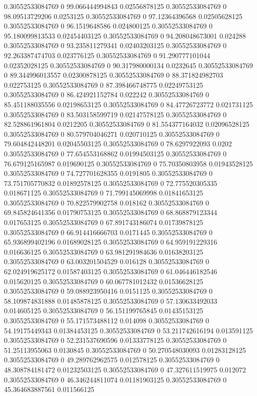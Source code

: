 0.30552533084769 0 99.066444994843 0.02556878125
0.30552533084769 0 98.09513729206 0.0253125
0.30552533084769 0 97.12364396568 0.02505628125
0.30552533084769 0 96.1519648586 0.024800125
0.30552533084769 0 95.180099813533 0.02454403125
0.30552533084769 0 94.208048673001 0.024288
0.30552533084769 0 93.235811279341 0.02403203125
0.30552533084769 0 92.263387474703 0.023776125
0.30552533084769 0 91.290777101044 0.02352028125
0.30552533084769 0 90.317980000134 0.0232645
0.30552533084769 0 89.344996013557 0.02300878125
0.30552533084769 0 88.371824982703 0.022753125
0.30552533084769 0 87.398466748775 0.02249753125
0.30552533084769 0 86.424921152784 0.022242
0.30552533084769 0 85.451188035556 0.02198653125
0.30552533084769 0 84.47726723772 0.021731125
0.30552533084769 0 83.503158599719 0.02147578125
0.30552533084769 0 82.528861961804 0.0212205
0.30552533084769 0 81.554377164032 0.02096528125
0.30552533084769 0 80.579704046271 0.020710125
0.30552533084769 0 79.604842448201 0.02045503125
0.30552533084769 0 78.6297922093 0.0202
0.30552533084769 0 77.654553168862 0.01994503125
0.30552533084769 0 76.679125165987 0.019690125
0.30552533084769 0 75.70350803958 0.01943528125
0.30552533084769 0 74.727701628355 0.0191805
0.30552533084769 0 73.751705770832 0.01892578125
0.30552533084769 0 72.775520305335 0.018671125
0.30552533084769 0 71.799145069998 0.01841653125
0.30552533084769 0 70.822579902758 0.018162
0.30552533084769 0 69.845824641356 0.01790753125
0.30552533084769 0 68.868879123344 0.017653125
0.30552533084769 0 67.891743186074 0.01739878125
0.30552533084769 0 66.914416666703 0.0171445
0.30552533084769 0 65.936899402196 0.01689028125
0.30552533084769 0 64.959191229316 0.016636125
0.30552533084769 0 63.981291984636 0.01638203125
0.30552533084769 0 63.003201504529 0.016128
0.30552533084769 0 62.024919625172 0.01587403125
0.30552533084769 0 61.046446182546 0.015620125
0.30552533084769 0 60.067781012432 0.01536628125
0.30552533084769 0 59.088923950416 0.0151125
0.30552533084769 0 58.109874831888 0.01485878125
0.30552533084769 0 57.130633492033 0.014605125
0.30552533084769 0 56.151199765845 0.01435153125
0.30552533084769 0 55.171573488112 0.014098
0.30552533084769 0 54.19175449343 0.01384453125
0.30552533084769 0 53.211742616194 0.013591125
0.30552533084769 0 52.231537690596 0.01333778125
0.30552533084769 0 51.25113955063 0.0130845
0.30552533084769 0 50.270548030093 0.01283128125
0.30552533084769 0 49.289762962575 0.012578125
0.30552533084769 0 48.308784181472 0.01232503125
0.30552533084769 0 47.327611519975 0.012072
0.30552533084769 0 46.346244811074 0.01181903125
0.30552533084769 0 45.364683887561 0.011566125
